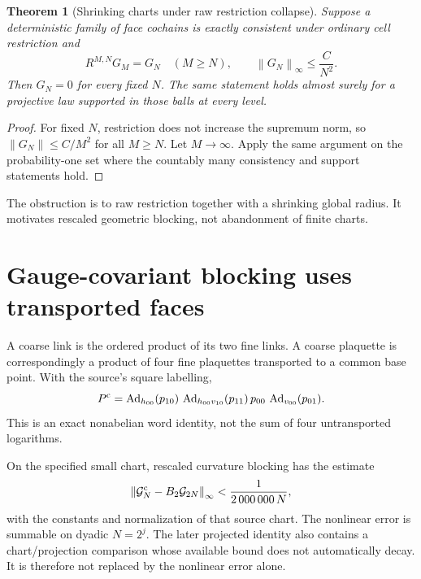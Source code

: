 \documentclass[11pt,a4paper,oneside]{book}
\theoremstyle{plain}
\newtheorem{theorem}{Theorem}[chapter]
\theoremstyle{definition}
\theoremstyle{remark}
\newcommand{\Ad}{\operatorname{Ad}}
\newcommand{\norm}[1]{\left\lVert#1\right\rVert}
\newcommand{\src}[2]{\cite{#1}}
\begin{document}
\begin{theorem}[Shrinking charts under raw restriction collapse]
\label{thm:shrinking-chart}
Suppose a deterministic family of face cochains is exactly consistent under ordinary cell restriction and
\begin{equation}
 R^{M,N}G_M=G_N\quad(M\ge N),\qquad
 \norm{G_N}_\infty\le\frac C{N^2}.
 \label{eq:shrinking-chart}
\end{equation}
Then $G_N=0$ for every fixed $N$. The same statement holds almost surely for a projective law supported in those balls at every level.
\end{theorem}
\begin{proof}
For fixed $N$, restriction does not increase the supremum norm, so $\norm{G_N}\le C/M^2$ for all $M\ge N$. Let $M\to\infty$. Apply the same argument on the probability-one set where the countably many consistency and support statements hold.
\end{proof}
\src{R18}{thm:v18v94-trivial-projective}
The obstruction is to raw restriction together with a shrinking global radius. It motivates rescaled geometric blocking, not abandonment of finite charts.

\section{Gauge-covariant blocking uses transported faces}
A coarse link is the ordered product of its two fine links. A coarse plaquette is correspondingly a product of four fine plaquettes transported to a common base point. With the source's square labelling,
\begin{equation}
 P^{\rm c}
 =\Ad_{h_{00}}(p_{10})\,
  \Ad_{h_{00}v_{10}}(p_{11})\,
  p_{00}\,\Ad_{v_{00}}(p_{01}).
 \label{eq:four-face}
\end{equation}
This is an exact nonabelian word identity, not the sum of four untransported logarithms. \src{R18}{thm:v18v96-four-face-word}

On the specified small chart, rescaled curvature blocking has the estimate
\begin{equation}
 \norm{\mathcal G_N^{\rm c}-B_2\mathcal G_{2N}}_\infty
 <\frac1{2\,000\,000\,N},
 \label{eq:nonlinear-blocking}
\end{equation}
with the constants and normalization of that source chart. The nonlinear error is summable on dyadic $N=2^j$. The later projected identity also contains a chart/projection comparison whose available bound does not automatically decay. It is therefore not replaced by the nonlinear error alone. \src{R18}{thm:v18v97-rescaled-error,thm:v18v98-projected-identity}
\end{document}
